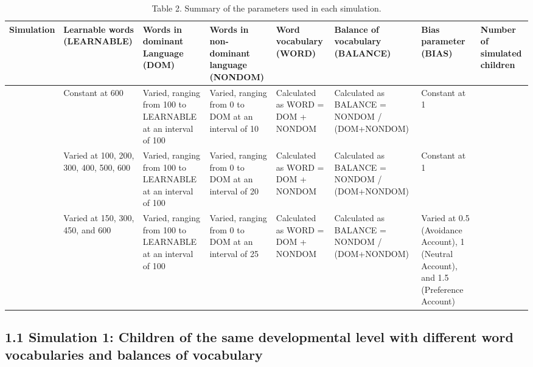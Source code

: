 \documentclass[
  english,
  ,man,floatsintext]{apa6}
\begin{document}
\begin{landscape}\begin{table}

\caption{\label{tab:table2}Table 2. Summary of the parameters used in each simulation.}
\centering
\fontsize{8}{10}\selectfont
\begin{tabular}[t]{>{\centering\arraybackslash}p{45px}>{\raggedright\arraybackslash}p{45px}>{\raggedright\arraybackslash}p{75px}>{\raggedright\arraybackslash}p{75px}>{\raggedright\arraybackslash}p{75px}>{\raggedright\arraybackslash}p{75px}>{\raggedright\arraybackslash}p{75px}>{\raggedright\arraybackslash}p{45px}}
\toprule
Simulation & Learnable words (LEARNABLE) & Words in dominant Language (DOM) & Words in non-dominant language (NONDOM) & Word vocabulary (WORD) & Balance of vocabulary (BALANCE) & Bias parameter (BIAS) & Number of simulated children\\
\midrule
1 & Constant at 600 & Varied, ranging from 100 to LEARNABLE at an interval of 100 & Varied, ranging from 0 to DOM at an interval of 10 & Calculated as WORD = DOM + NONDOM & Calculated as BALANCE = NONDOM / (DOM+NONDOM) & Constant at 1 & 216\\
2 & Varied at 100, 200, 300, 400, 500, 600 & Varied, ranging from 100 to LEARNABLE at an interval of 100 & Varied, ranging from 0 to DOM at an interval of 20 & Calculated as WORD = DOM + NONDOM & Calculated as BALANCE = NONDOM / (DOM+NONDOM) & Constant at 1 & 301\\
3 & Varied at 150, 300, 450, and 600 & Varied, ranging from 100 to LEARNABLE at an interval of 100 & Varied, ranging from 0 to DOM at an interval of 25 & Calculated as WORD = DOM + NONDOM & Calculated as BALANCE = NONDOM / (DOM+NONDOM) & Varied at 0.5 (Avoidance Account), 1 (Neutral Account), and 1.5 (Preference Account) & 166\\
\bottomrule
\end{tabular}
\end{table}
\end{landscape}

\hypertarget{simulation-1-children-of-the-same-developmental-level-with-different-word-vocabularies-and-balances-of-vocabulary}{%
\subsection{1.1 Simulation 1: Children of the same developmental level with different word vocabularies and balances of vocabulary}\label{simulation-1-children-of-the-same-developmental-level-with-different-word-vocabularies-and-balances-of-vocabulary}}
\end{document}
